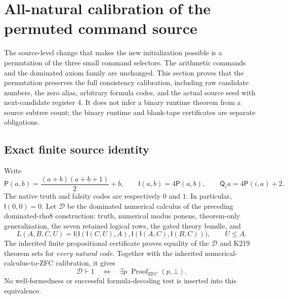 \begingroup
\newcommand{\Kp}{\mathsf P}
\newcommand{\Ki}{\mathsf I}
\newcommand{\Kq}{\mathsf Q}
\newcommand{\Kd}{\mathcal D}
\newcommand{\Kax}{\mathsf{AX}}
\newcommand{\Kmp}{\mathsf{MP}}
\newcommand{\Kdrop}{\mathsf{DROP}}
\newcommand{\Knip}{\mathsf{NIP}}
\newcommand{\Kenc}{\operatorname{enc}}
\newcommand{\Kblk}{\mathcal B}
\newcommand{\Kdiscard}{\mathsf{Discard}}

\section{All-natural calibration of the permuted command source}
\label{sec:k216-source-calibration}

The source-level change that makes the new initialization possible is a
permutation of the three small command selectors. The arithmetic
commands and the dominated axiom family are unchanged. This section
proves that the permutation preserves the full consistency calibration,
including raw candidate numbers, the zero alias, arbitrary formula
codes, and the actual source seed with next-candidate register $4$.
It does not infer a binary runtime theorem from a source subtree count;
the binary runtime and blank-tape certificates are separate obligations.

\subsection{Exact finite source identity}

Write
\[
 \Kp(a,b)=\frac{(a+b)(a+b+1)}2+b,\qquad
 \Ki(a,b)=4\Kp(a,b),\qquad
 \Kq_i a=4\Kp(i,a)+2.
\]
The native truth and falsity codes are respectively $0$ and $1$.
In particular, $\Ki(0,0)=0$. Let $\Kd$ be the dominated numerical
calculus of the preceding dominated-rho8 construction: truth, numerical
modus ponens, theorem-only generalization, the seven retained logical
rows, the gated theory bundle, and
\[
 L(A,B,C,U)=
 \Ki\bigl(\Ki(\Ki(C,U),A),
            \Ki(\Ki(A,C),\Ki(B,C))\bigr),\qquad U\leq A.
\]
The inherited finite propositional certificate proves equality of the
$\Kd$ and K219 theorem sets for \emph{every natural code}. Together with
the inherited numerical-calculus-to-ZFC calibration, it gives
\begin{equation}
 \Kd\vdash1\quad\Longleftrightarrow\quad
 \exists p\;\operatorname{Proof}_{\mathrm{ZFC}}(p,\bot).
 \label{eq:k216-inherited-calibration}
\end{equation}
No well-formedness or successful formula-decoding test is inserted into
this equivalence.

